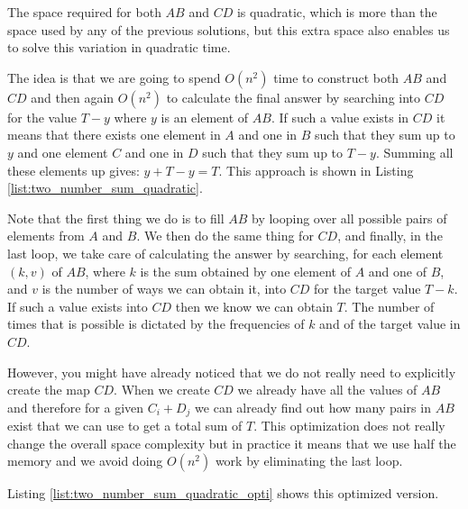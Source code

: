 The space required for both $AB$ and $CD$ is quadratic, which is more than the space used by any of the previous solutions, but this extra space
also enables us to solve this variation in quadratic time. 

The idea is that we are going to spend $O(n^2)$ time to construct both $AB$ and $CD$
and then again $O(n^2)$ to calculate the final answer 
by searching into $CD$ for the value $T-y$ where $y$ is an element of $AB$. 
If such a value exists in $CD$ it means that there exists one element in  $A$ and one in $B$ such that they sum up to $y$ and
one element $C$ and one in $D$ such that they sum up to $T-y$. Summing all these elements up gives: $y+T-y = T$.
This approach is shown in Listing \ref{list:two_number_sum_quadratic}. 



Note that the first thing we do is to fill $AB$ by looping over all possible pairs of elements from $A$ and $B$.
We then do the same thing for $CD$, and finally, in the last loop, we take care of calculating the answer by searching, for each element $(k,v)$ of $AB$, where $k$ is the sum obtained by one element of $A$ and one of $B$, and $v$ is the number of ways we can obtain it,
into $CD$ for the target value $T-k$. If such a value exists into $CD$ then we know we can obtain $T$. The number of times
that is possible is dictated by the frequencies of $k$ and of the target value in $CD$.

However, you might have already noticed that we do not really need to explicitly create the map $CD$. 
When we create $CD$ we already have all the values of $AB$  and therefore for a given $C_i+D_j$ we can already find out how many pairs in $AB$ exist that we can use to get a total sum of $T$. 
This optimization does not really change the overall space complexity
but in practice it means that we use half the memory and we avoid doing $O(n^2)$ work by eliminating the last loop.

Listing \ref{list:two_number_sum_quadratic_opti} shows this optimized version.




